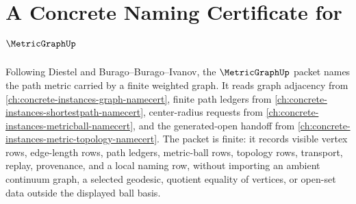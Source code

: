 \chapter{A Concrete Naming Certificate for $\MetricGraphUp$}
\label{ch:concrete-instances-metric-graph-namecert}

Following Diestel and Burago--Burago--Ivanov, the $\MetricGraphUp$ packet names the path metric carried by a finite weighted graph. It reads graph adjacency from \autoref{ch:concrete-instances-graph-namecert}, finite path ledgers from \autoref{ch:concrete-instances-shortestpath-namecert}, center-radius requests from \autoref{ch:concrete-instances-metricball-namecert}, and the generated-open handoff from \autoref{ch:concrete-instances-metric-topology-namecert}. The packet is finite: it records visible vertex rows, edge-length rows, path ledgers, metric-ball rows, topology rows, transport, replay, provenance, and a local naming row, without importing an ambient continuum graph, a selected geodesic, quotient equality of vertices, or open-set data outside the displayed ball basis.

